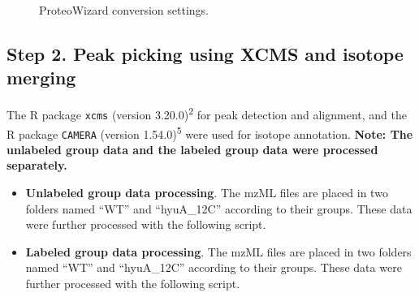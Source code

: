 \documentclass[
  letterpaper,
  DIV=11,
  numbers=noendperiod]{scrreprt}
\providecommand{\tightlist}{%
  \setlength{\itemsep}{0pt}\setlength{\parskip}{0pt}}
\begin{document}
\begin{figure}


\caption{\label{fig-figure2-2}ProteoWizard conversion settings.}

\end{figure}%

\subsection{Step 2. Peak picking using XCMS and isotope
merging}\label{step-2.-peak-picking-using-xcms-and-isotope-merging}

The R package \texttt{xcms} (version 3.20.0)\textsuperscript{2} for peak
detection and alignment, and the R package \texttt{CAMERA} (version
1.54.0)\textsuperscript{5} were used for isotope annotation.
\textbf{Note: The unlabeled group data and the labeled group data were
processed separately.}

\begin{itemize}
\tightlist
\item
  \textbf{Unlabeled group data processing}. The mzML files are placed in
  two folders named ``WT'' and ``hyuA\_12C'' according to their groups.
  These data were further processed with the following script.
\item
  \textbf{Labeled group data processing}. The mzML files are placed in
  two folders named ``WT'' and ``hyuA\_12C'' according to their groups.
  These data were further processed with the following script.
\end{itemize}
\end{document}
